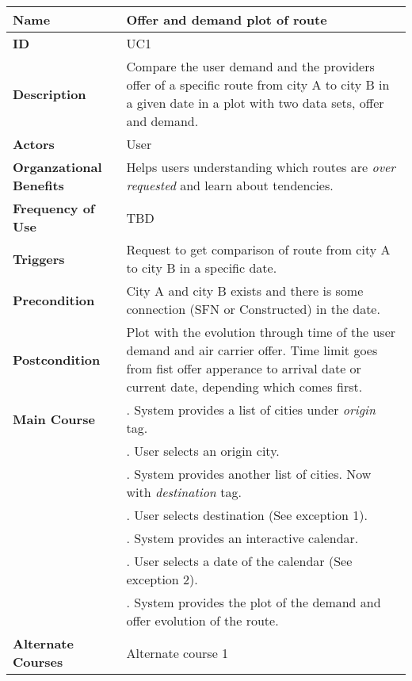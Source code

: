 \begin{table}
\begin{tabular}{|>{\raggedright\arraybackslash}p{3.2cm}|>{\raggedright\arraybackslash}p{10cm}|}
\hline
\textbf{Name}                   & Offer and demand plot of route \\
\hline
\textbf{ID}                     & UC1 \\
\hline
\textbf{Description}            & Compare the user demand and the providers offer of a specific route from city A to city B in a given date in a plot with two data sets, offer and demand. \\
\hline
\textbf{Actors}                 & User \\
\hline
\textbf{Organzational Benefits} & Helps users understanding which routes are \textit{over requested} and learn about tendencies. \\
\hline
\textbf{Frequency of Use}       & TBD \\
\hline
\textbf{Triggers}               & Request to get comparison of route from city A to city B in a specific date. \\
\hline
\textbf{Precondition}           & City A and city B exists and there is some connection (SFN or Constructed) in the date. \\
\hline
\textbf{Postcondition}          & Plot with the evolution through time of the user demand and air carrier offer. Time limit goes from fist offer apperance to arrival date or current date, depending which comes first. \\
\hline
\textbf{Main Course}            & 1. System provides a list of cities under \textit{origin} tag. \\
                                & 2. User selects an origin city. \\
                                & 3. System provides another list of cities. Now with \textit{destination} tag. \\
                                & 4. User selects destination (See exception 1). \\
                                & 5. System provides an interactive calendar. \\
                                & 6. User selects a date of the calendar (See exception 2). \\
                                & 7. System provides the plot of the demand and offer evolution of the route. \\
\hline
\textbf{Alternate Courses}      & Alternate course 1 \\

\end{tabular}
\end{table}
